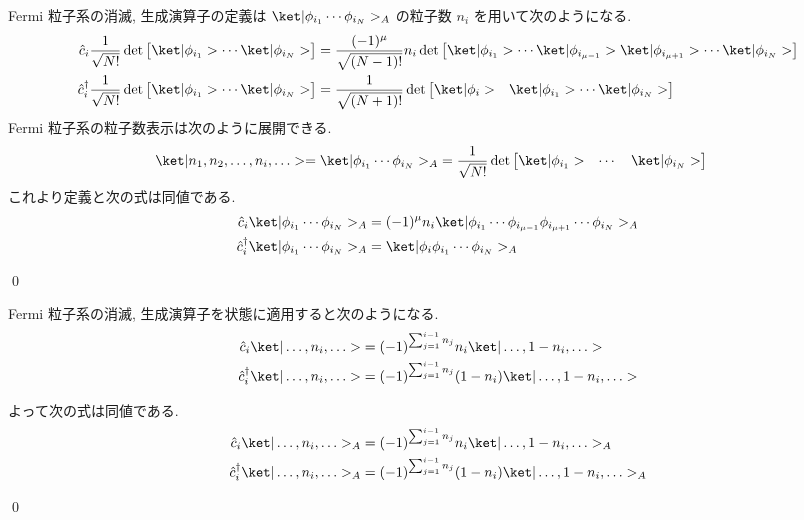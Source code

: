 \documentclass[uplatex,dvipdfmx,a4paper,11pt]{jlreq}
\makeatletter
\DeclareMathOperator{\Det}{det}
\numberwithin{equation}{section}
\theoremstyle{definition}
\renewenvironment{proof}[1][\proofname]{\par
  \normalfont
  \topsep6\p@\@plus6\p@ \trivlist
  \item[\hskip\labelsep{\bfseries #1}\@addpunct{\bfseries}]\ignorespaces\quad\par
}{
  \qed\endtrivlist\@endpefalse
}
\renewcommand\proofname{証明}
\makeatother
\begin{document}
\begin{proof}
  Fermi 粒子系の消滅, 生成演算子の定義は $\ket|\phi_{i_1}\cdots\phi_{i_N}>_A$ の粒子数 $n_i$ を用いて次のようになる.
  \begin{align}
    \hat{c}_i\frac{1}{\sqrt{N!}}\Det\begin{bmatrix}\ket|\phi_{i_1}> \cdots \ket|\phi_{i_N}>\end{bmatrix}         & = \frac{(-1)^\mu}{\sqrt{(N-1)!}}n_i\Det\begin{bmatrix}\ket|\phi_{i_1}> \cdots \ket|\phi_{i_{\mu-1}}>\ket|\phi_{i_{\mu+1}}>\cdots\ket|\phi_{i_N}>\end{bmatrix} \\
    \hat{c}_i^\dagger\frac{1}{\sqrt{N!}}\Det\begin{bmatrix}\ket|\phi_{i_1}> \cdots \ket|\phi_{i_N}>\end{bmatrix} & = \frac{1}{\sqrt{(N+1)!}}\Det\begin{bmatrix}\ket|\phi_i> & \ket|\phi_{i_1}> \cdots \ket|\phi_{i_N}>\end{bmatrix}
  \end{align}
  Fermi 粒子系の粒子数表示は次のように展開できる.
  \begin{align}
    \ket|n_1,n_2,\ldots,n_i,\ldots> = \ket|\phi_{i_1}\cdots\phi_{i_N}>_A & = \frac{1}{\sqrt{N!}}\Det\begin{bmatrix}\ket|\phi_{i_1}> & \cdots & \ket|\phi_{i_N}>\end{bmatrix}
  \end{align}
  これより定義と次の式は同値である.
  \begin{align}
    \hat{c}_i\ket|\phi_{i_1}\cdots\phi_{i_N}>_A         & = (-1)^\mu n_i\ket|\phi_{i_1}\cdots\phi_{i_{\mu-1}}\phi_{i_{\mu+1}}\cdots\phi_{i_N}>_A \\
    \hat{c}_i^\dagger\ket|\phi_{i_1}\cdots\phi_{i_N}>_A & = \ket|\phi_i\phi_{i_1}\cdots\phi_{i_N}>_A
  \end{align}
\end{proof}

\begin{theorem}[Q21-50, Q21-51]
  Fermi 粒子系の消滅, 生成演算子を状態に適用すると次のようになる.
  \begin{align}
    \hat{c}_i\ket|\ldots,n_i,\ldots>         & = (-1)^{\sum_{j=1}^{i-1}n_j}n_i\ket|\ldots,1-n_i,\ldots>       \\
    \hat{c}_i^\dagger\ket|\ldots,n_i,\ldots> & = (-1)^{\sum_{j=1}^{i-1}n_j}(1 - n_i)\ket|\ldots,1-n_i,\ldots>
  \end{align}
\end{theorem}
\begin{proof}
  よって次の式は同値である.
  \begin{align}
    \hat{c}_i\ket|\ldots,n_i,\ldots>_A         & = (-1)^{\sum_{j=1}^{i-1}n_j} n_i\ket|\ldots,1-n_i,\ldots>_A    \\
    \hat{c}_i^\dagger\ket|\ldots,n_i,\ldots>_A & = (-1)^{\sum_{j=1}^{i-1}n_j}(1-n_i)\ket|\ldots,1-n_i,\ldots>_A
  \end{align}
\end{proof}
\end{document}
